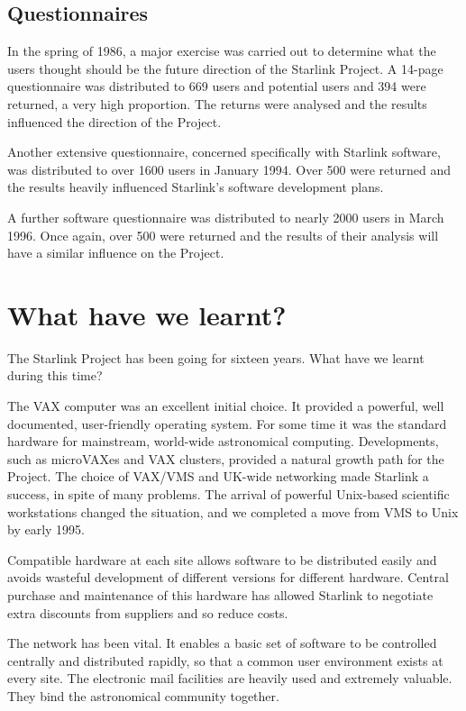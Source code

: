 \subsection*{Questionnaires}

In the spring of 1986, a major exercise was carried out to determine what the
users thought should be the future direction of the Starlink Project.
A 14-page questionnaire was distributed to 669 users and potential users and
394 were returned, a very high proportion.
The returns were analysed and the results influenced the direction of the
Project.

Another extensive questionnaire, concerned specifically with Starlink software,
was distributed to over 1600 users in January 1994.
Over 500 were returned and the results heavily influenced Starlink's software
development plans.

A further software questionnaire was distributed to nearly 2000 users in March
1996.
Once again, over 500 were returned and the results of their analysis will have
a similar influence on the Project.

\newpage

\section*{What have we learnt?}

The Starlink Project has been going for sixteen years.
What have we learnt during this time?

The VAX computer was an excellent initial choice.
It provided a powerful, well documented, user-friendly operating system.
For some time it was the standard hardware for mainstream, world-wide
astronomical computing.
Developments, such as microVAXes and VAX clusters, provided a natural growth
path for the Project.
The choice of VAX/VMS and UK-wide networking made Starlink a success, in spite
of many problems.
The arrival of powerful Unix-based scientific workstations changed the
situation, and we completed a move from VMS to Unix by early 1995.

Compatible hardware at each site allows software to be distributed easily
and avoids wasteful development of different versions for different
hardware.
Central purchase and maintenance of this hardware has allowed Starlink to
negotiate extra discounts from suppliers and so reduce costs.

The network has been vital.
It enables a basic set of software to be controlled centrally and distributed
rapidly, so that a common user environment exists at every site.
The electronic mail facilities are heavily used and extremely valuable.
They bind the astronomical community together.


